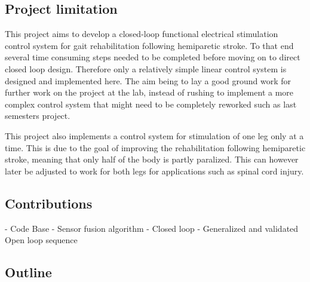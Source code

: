 \subsection{Project limitation}
This project aims to develop a closed-loop functional electrical stimulation control system for gait rehabilitation following hemiparetic stroke. To that end several time consuming steps needed to be completed before moving on to direct closed loop design. Therefore only a relatively simple linear control system is designed and implemented here. The aim being to lay a good ground work for further work on the project at the lab, instead of rushing to implement a more complex control system that might need to be completely reworked such as last semesters project. 

This project also implements a control system for stimulation of one leg only at a time. This is due to the goal of improving the rehabilitation following hemiparetic stroke, meaning that only half of the body is partly paralized. This can however later be adjusted to work for both legs for applications such as spinal cord injury.



\subsection{Contributions}
- Code Base
- Sensor fusion algorithm
- Closed loop
- Generalized and validated Open loop sequence


\subsection{Outline}









